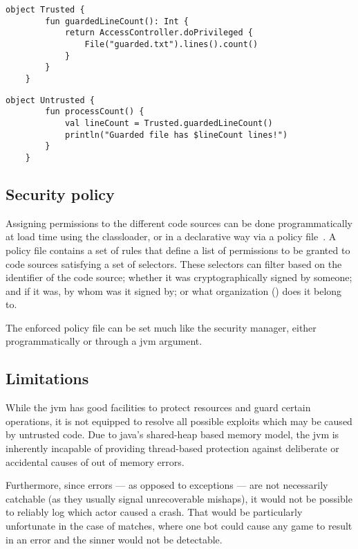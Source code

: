 	\begin{center}
		\begin{minipage}{12cm}
		\begin{lstlisting}[title={\code{Trusted.kt}}]
	object Trusted {
		fun guardedLineCount(): Int {
			return AccessController.doPrivileged {
				File("guarded.txt").lines().count()
			}
		}
	}
		\end{lstlisting}
	
		\begin{lstlisting}[title={\code{Untrusted.kt}}]
	object Untrusted {
		fun processCount() {
			val lineCount = Trusted.guardedLineCount()
			println("Guarded file has $lineCount lines!")
		}
	}
		\end{lstlisting}
		\end{minipage}
	\end{center}

	\subsection{Security policy}
	
	Assigning permissions to the different code sources can be done programmatically at load time using the classloader, or in a declarative way via a policy file~\cite{JavaPermissionsPolicy}. A policy file contains a set of rules that define a list of permissions to be granted to code sources satisfying a set of selectors. These selectors can filter based on the identifier of the code source; whether it was cryptographically signed by someone; and if it was, by whom was it signed by; or what organization () does it belong to.
	
	The enforced policy file can be set much like the security manager, either programmatically or through a jvm argument. 

	\subsection{Limitations}
	
	While the jvm has good facilities to protect resources and guard certain operations, it is not equipped to resolve all possible exploits which may be caused by untrusted code. Due to java's shared-heap based memory model, the jvm is inherently incapable of providing thread-based protection against deliberate or accidental causes of out of memory errors.
	
	Furthermore, since errors --- as opposed to exceptions --- are not necessarily catchable (as they usually signal unrecoverable mishaps), it would not be possible to reliably log which actor caused a crash. That would be particularly unfortunate in the case of matches, where one bot could cause any game to result in an error and the sinner would not be detectable.  

%








